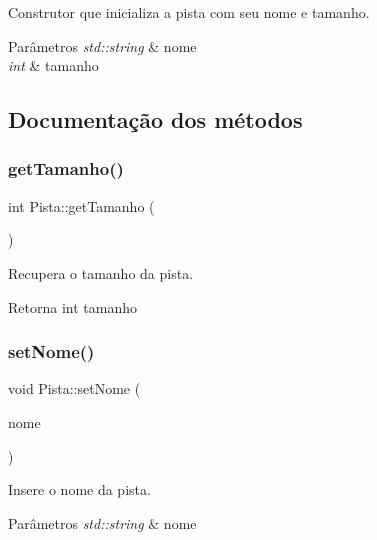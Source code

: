 Construtor que inicializa a pista com seu nome e tamanho. 


\begin{DoxyParams}{Parâmetros}
{\em std\+::string} & nome \\
\hline
{\em int} & tamanho \\
\hline
\end{DoxyParams}


\subsection{Documentação dos métodos}
\mbox{\label{classPista_af77d7913dcf238a5c5a11beafc4e49ce}} 
\subsubsection{\texorpdfstring{get\+Tamanho()}{getTamanho()}}
{\footnotesize\ttfamily int Pista\+::get\+Tamanho (\begin{DoxyParamCaption}{ }\end{DoxyParamCaption})}



Recupera o tamanho da pista. 

\begin{DoxyReturn}{Retorna}
int tamanho 
\end{DoxyReturn}
\mbox{\label{classPista_ad0c553cfa88f083810eb6259e328df7b}} 
\subsubsection{\texorpdfstring{set\+Nome()}{setNome()}}
{\footnotesize\ttfamily void Pista\+::set\+Nome (\begin{DoxyParamCaption}\item[{std\+::string}]{nome }\end{DoxyParamCaption})}



Insere o nome da pista. 


\begin{DoxyParams}{Parâmetros}
{\em std\+::string} & nome \\
\hline
\end{DoxyParams}
\mbox{\label{classPista_a08d26ad19e300462d05208e6e15b56e7}} 
